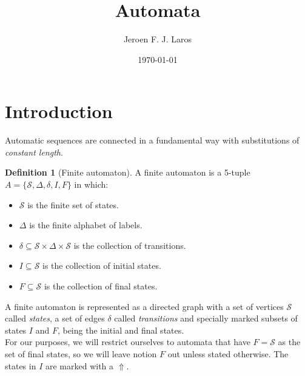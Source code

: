 \documentclass{article}
\title{Automata}
\author{Jeroen F. J. Laros}
\date{\today}
\begin{document}
\renewcommand{\qedsymbol}{$\blacksquare$}
\newcommand{\bs}{\begin{small}}
\newcommand{\es}{\end{small}}
\newcommand{\bS}{\begin{tiny}}
\newcommand{\eS}{\end{tiny}}
\newcommand{\monoit}[1]{\texttt{\textit{#1}}}

\newtheorem{theorem}{Theorem}[section]
\newtheorem{lemma}[theorem]{Lemma}
\newtheorem{corollary}[theorem]{Corollary}

\theoremstyle{definition}
\newtheorem{example}[theorem]{Example}
\newtheorem{definition}[theorem]{Definition}
\newtheorem{remark}[theorem]{Remark}

\maketitle

\section{Introduction}
Automatic sequences are connected in a fundamental way with substitutions of
\emph{constant length}.

\begin{definition}[Finite automaton] \label{def:fa}
A finite automaton is a 5-tuple $A = \{\mathcal{S}, \Delta, \delta, I, F\}$
in which:
\begin{itemize}
\item $\mathcal{S}$ is the finite set of states.
\item $\Delta$ is the finite alphabet of labels.
\item $\delta \subseteq \mathcal{S} \times \Delta \times \mathcal{S}$ is the 
collection of transitions.
\item $I \subseteq \mathcal{S}$ is the collection of initial states.
\item $F \subseteq \mathcal{S}$ is the collection of final states.
\end{itemize}
\end{definition}

A finite automaton is represented as a directed graph with a set of vertices
$\mathcal{S}$ called \emph{states}, a set of edges $\delta$ called 
\emph{transitions}
and specially marked subsets of states $I$ and $F$, being the initial and final
states.\\
For our purposes, we will restrict ourselves to automata that have
$F = \mathcal{S}$ as the set of final states, so we will leave notion $F$
out unless stated otherwise. The states in $I$ are marked with a $\Uparrow$.
\end{document}
